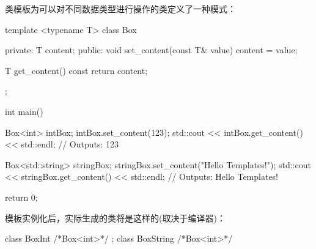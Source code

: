 
类模板为可以对不同数据类型进行操作的类定义了一种模式：

\begin{cpp}
template <typename T>
class Box {
private:
    T content;
public:
    void set_content(const T& value) {
        content = value;
    }

    T get_content() const {
        return content;
    }
};

int main() {
    Box<int> intBox;
    intBox.set_content(123);
    std::cout << intBox.get_content() << std::endl; // Outputs: 123

    Box<std::string> stringBox;
    stringBox.set_content("Hello Templates!");
    std::cout << stringBox.get_content() << std::endl; // Outputs: Hello Templates!

    return 0;
}
\end{cpp}

模板实例化后，实际生成的类将是这样的(取决于编译器)：

\begin{cpp}
class BoxInt { /*Box<int>*/ };
class BoxString { /*Box<int>*/ }
\end{cpp}




